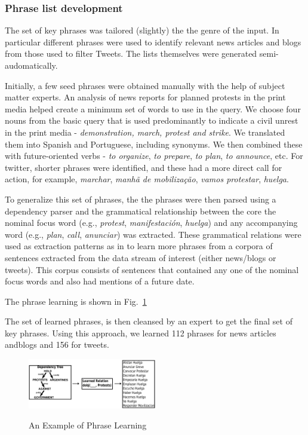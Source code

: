 \subsubsection{Phrase list development}
\label{sec:phraselearning}

The set of key phrases was tailored (slightly) the the genre of the
input. In particular different phrases were used to identify relevant
news articles and blogs from those used to filter Tweets.  The lists
themselves were generated semi-audomatically.

Initially, a few seed phrases were obtained manually
with the help of subject matter experts.
An analysis of news reports for planned protests in the print media helped create a
minimum set of words to use in the query.  We choose four nouns from
the basic query that is used predominantly to indicate a civil unrest
in the print media - {\em demonstration, march, protest and
  strike}. We translated them into Spanish and Portuguese, including
synonyms.  We then combined these with future-oriented verbs - {\em to organize}, {\em to prepare}, {\em to
plan}, {\em to announce}, etc. For twitter, shorter phrases were identified, and these had
a more direct call for action, for example, {\em marchar}, {\em manhã de mobilização}, {\em
  vamos protestar}, {\em huelga}.

To generalize this set of phrases, the the phrases were then parsed
using a dependency parser \cite{freeling} and the grammatical
relationship between the core the nominal focus word (e.g., {\em
  protest}, {\em manifestación}, {\em huelga}) and any accompanying
word (e.g., {\em plan}, {\em call}, {\em anunciar}) was
extracted. These grammatical relations were used as extraction
patterns as in \cite{riloff2003learning} to learn more phrases from a
corpora of sentences extracted from the data stream of interest
(either news/blogs or tweets). This corpus consists of sentences that
contained any one of the nominal focus words and also had mentions of a
future date.

The phrase learning is shown in Fig.~\ref{fig:phraselearning}

The set of learned phrases, is then cleansed by an expert to get the final set of key phrases.
Using this approach, we learned 112 phrases for news articles andblogs and 156 for tweets.

\begin{figure}
\caption{An Example of Phrase Learning}
\includegraphics[width=0.5\textwidth]{figures/phraseLearning}
\label{fig:phraselearning}
\end{figure}


